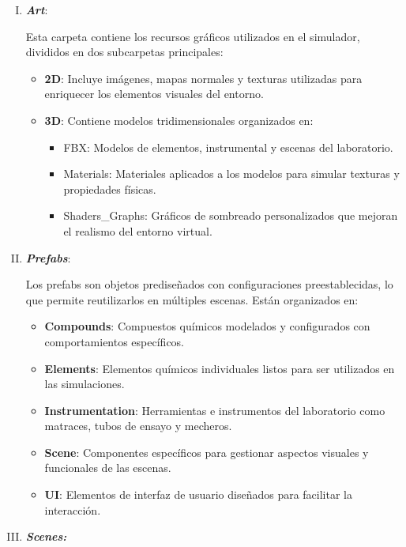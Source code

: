 \begin{enumerate} [I. ]
    \item \textit{\textbf{Art}}:
    
    Esta carpeta contiene los recursos gráficos utilizados en el simulador, divididos en dos subcarpetas principales:
    \begin{itemize}
        \item \textbf{2D}: Incluye imágenes, mapas normales y texturas utilizadas para enriquecer los elementos visuales del entorno.
        \newpage
        \item \textbf{3D}: Contiene modelos tridimensionales organizados en:
        \begin{itemize}
            \item FBX: Modelos de elementos, instrumental y escenas del laboratorio.
            \item Materials: Materiales aplicados a los modelos para simular texturas y propiedades físicas.
            \item Shaders\_Graphs: Gráficos de sombreado personalizados que mejoran el realismo del entorno virtual.
        \end{itemize}
    \end{itemize}

    \item \textit{\textbf{Prefabs}}:
    
    Los prefabs son objetos prediseñados con configuraciones preestablecidas, lo que permite reutilizarlos en múltiples escenas. Están organizados en:
    \begin{itemize}
        \item \textbf{Compounds}: Compuestos químicos modelados y configurados con comportamientos específicos.
        \item \textbf{Elements}: Elementos químicos individuales listos para ser utilizados en las simulaciones.
        \item \textbf{Instrumentation}: Herramientas e instrumentos del laboratorio como matraces, tubos de ensayo y mecheros.
        \item \textbf{Scene}: Componentes específicos para gestionar aspectos visuales y funcionales de las escenas.
        \item \textbf{UI}: Elementos de interfaz de usuario diseñados para facilitar la interacción.
    \end{itemize}

    \item \textit{\textbf{Scenes:}}
    

\end{enumerate}
